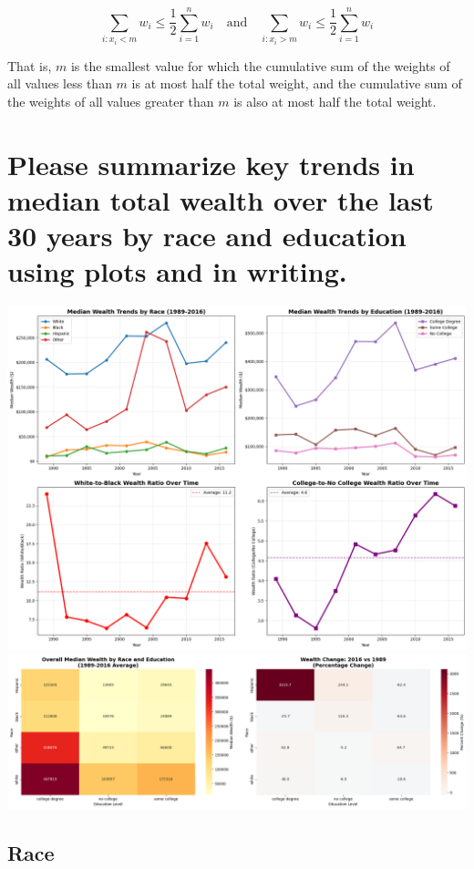 \documentclass[
  12pt]{article}
\begin{document}
\[
\sum_{i: x_i < m} w_i \leq \frac{1}{2} \sum_{i=1}^n w_i \quad \text{and} \quad \sum_{i: x_i > m} w_i \leq \frac{1}{2} \sum_{i=1}^n w_i
\]

That is, \(m\) is the smallest value for which the cumulative sum of the
weights of all values less than \(m\) is at most half the total weight,
and the cumulative sum of the weights of all values greater than \(m\)
is also at most half the total weight.

\section{Please summarize key trends in median total wealth over the
last 30 years by race and education using plots and in
writing.}\label{please-summarize-key-trends-in-median-total-wealth-over-the-last-30-years-by-race-and-education-using-plots-and-in-writing.}

\includegraphics{Images/1.png} \includegraphics{Images/2.png}

\subsection{Race}\label{race}
\end{document}
